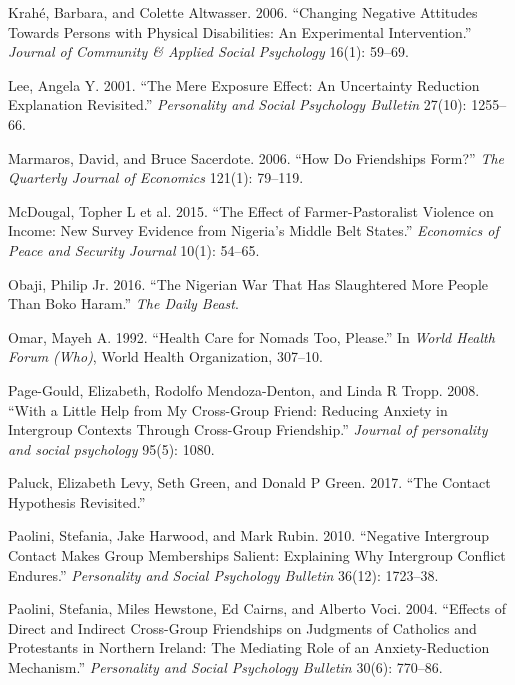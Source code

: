 \documentclass[11pt]{article}
\begin{document}
\hypertarget{ref-krahe2006disabled}{}
Krahé, Barbara, and Colette Altwasser. 2006. ``Changing Negative
Attitudes Towards Persons with Physical Disabilities: An Experimental
Intervention.'' \emph{Journal of Community \& Applied Social Psychology}
16(1): 59--69.

\hypertarget{ref-lee2001mere}{}
Lee, Angela Y. 2001. ``The Mere Exposure Effect: An Uncertainty
Reduction Explanation Revisited.'' \emph{Personality and Social
Psychology Bulletin} 27(10): 1255--66.

\hypertarget{ref-marmaros2006friendships}{}
Marmaros, David, and Bruce Sacerdote. 2006. ``How Do Friendships Form?''
\emph{The Quarterly Journal of Economics} 121(1): 79--119.

\hypertarget{ref-mcdougal2015effect}{}
McDougal, Topher L et al. 2015. ``The Effect of Farmer-Pastoralist
Violence on Income: New Survey Evidence from Nigeria's Middle Belt
States.'' \emph{Economics of Peace and Security Journal} 10(1): 54--65.

\hypertarget{ref-obaji2016war}{}
Obaji, Philip Jr. 2016. ``The Nigerian War That Has Slaughtered More
People Than Boko Haram.'' \emph{The Daily Beast}.

\hypertarget{ref-omar1992health}{}
Omar, Mayeh A. 1992. ``Health Care for Nomads Too, Please.'' In
\emph{World Health Forum (Who)}, World Health Organization, 307--10.

\hypertarget{ref-page2008little}{}
Page-Gould, Elizabeth, Rodolfo Mendoza-Denton, and Linda R Tropp. 2008.
``With a Little Help from My Cross-Group Friend: Reducing Anxiety in
Intergroup Contexts Through Cross-Group Friendship.'' \emph{Journal of
personality and social psychology} 95(5): 1080.

\hypertarget{ref-paluck2017contact}{}
Paluck, Elizabeth Levy, Seth Green, and Donald P Green. 2017. ``The
Contact Hypothesis Revisited.''

\hypertarget{ref-paolini2010negative}{}
Paolini, Stefania, Jake Harwood, and Mark Rubin. 2010. ``Negative
Intergroup Contact Makes Group Memberships Salient: Explaining Why
Intergroup Conflict Endures.'' \emph{Personality and Social Psychology
Bulletin} 36(12): 1723--38.

\hypertarget{ref-paolini2004effects}{}
Paolini, Stefania, Miles Hewstone, Ed Cairns, and Alberto Voci. 2004.
``Effects of Direct and Indirect Cross-Group Friendships on Judgments of
Catholics and Protestants in Northern Ireland: The Mediating Role of an
Anxiety-Reduction Mechanism.'' \emph{Personality and Social Psychology
Bulletin} 30(6): 770--86.
\end{document}
